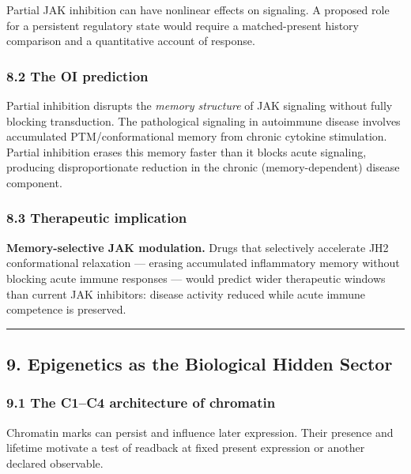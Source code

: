 \documentclass[
]{article}
\begin{document}
Partial JAK inhibition can have nonlinear effects on signaling. A
proposed role for a persistent regulatory state would require a
matched-present history comparison and a quantitative account of
response.

\hypertarget{the-oi-prediction-3}{%
\subsubsection{8.2 The OI prediction}\label{the-oi-prediction-3}}

Partial inhibition disrupts the \emph{memory structure} of JAK signaling
without fully blocking transduction. The pathological signaling in
autoimmune disease involves accumulated PTM/conformational memory from
chronic cytokine stimulation. Partial inhibition erases this memory
faster than it blocks acute signaling, producing disproportionate
reduction in the chronic (memory-dependent) disease component.

\hypertarget{therapeutic-implication-3}{%
\subsubsection{8.3 Therapeutic
implication}\label{therapeutic-implication-3}}

\textbf{Memory-selective JAK modulation.} Drugs that selectively
accelerate JH2 conformational relaxation --- erasing accumulated
inflammatory memory without blocking acute immune responses --- would
predict wider therapeutic windows than current JAK inhibitors: disease
activity reduced while acute immune competence is preserved.

\begin{center}\rule{0.5\linewidth}{0.5pt}\end{center}

\hypertarget{epigenetics-as-the-biological-hidden-sector}{%
\subsection{9. Epigenetics as the Biological Hidden
Sector}\label{epigenetics-as-the-biological-hidden-sector}}

\hypertarget{the-c1c4-architecture-of-chromatin}{%
\subsubsection{9.1 The C1--C4 architecture of
chromatin}\label{the-c1c4-architecture-of-chromatin}}

Chromatin marks can persist and influence later expression. Their
presence and lifetime motivate a test of readback at fixed present
expression or another declared observable.
\end{document}
